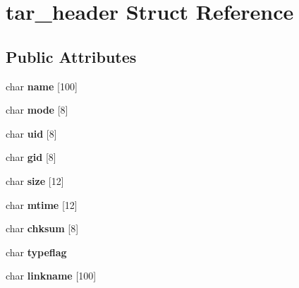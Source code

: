 \hypertarget{structtar__header}{\section{tar\+\_\+header Struct Reference}
\label{structtar__header}
}
\subsection*{Public Attributes}
\begin{DoxyCompactItemize}
\item 
\hypertarget{structtar__header_a921a7ac5906fd81909976fbc43fe404c}{char {\bfseries name} \mbox{[}100\mbox{]}}\label{structtar__header_a921a7ac5906fd81909976fbc43fe404c}

\item 
\hypertarget{structtar__header_a9c0f9c8fd9ef85f13b5e8cad47ca5217}{char {\bfseries mode} \mbox{[}8\mbox{]}}\label{structtar__header_a9c0f9c8fd9ef85f13b5e8cad47ca5217}

\item 
\hypertarget{structtar__header_a35c2f1c125c4ab1ee8bbb311ed9575ef}{char {\bfseries uid} \mbox{[}8\mbox{]}}\label{structtar__header_a35c2f1c125c4ab1ee8bbb311ed9575ef}

\item 
\hypertarget{structtar__header_aa1d8df38a2ac4ff6bf1ea1d99d0943a0}{char {\bfseries gid} \mbox{[}8\mbox{]}}\label{structtar__header_aa1d8df38a2ac4ff6bf1ea1d99d0943a0}

\item 
\hypertarget{structtar__header_ae0118a5add322d2cdf976cd1c3c82bd0}{char {\bfseries size} \mbox{[}12\mbox{]}}\label{structtar__header_ae0118a5add322d2cdf976cd1c3c82bd0}

\item 
\hypertarget{structtar__header_ade29454543ef3b9f6bfc47d4c0325ee4}{char {\bfseries mtime} \mbox{[}12\mbox{]}}\label{structtar__header_ade29454543ef3b9f6bfc47d4c0325ee4}

\item 
\hypertarget{structtar__header_a050e232fc9ed4ca3a22c0ce9c5b7748d}{char {\bfseries chksum} \mbox{[}8\mbox{]}}\label{structtar__header_a050e232fc9ed4ca3a22c0ce9c5b7748d}

\item 
\hypertarget{structtar__header_a8a9662777f906b3a4289881d49a4602c}{char {\bfseries typeflag}}\label{structtar__header_a8a9662777f906b3a4289881d49a4602c}

\item 
\hypertarget{structtar__header_a0f87c06d6b8eec283fb0a5f2482053d9}{char {\bfseries linkname} \mbox{[}100\mbox{]}}\label{structtar__header_a0f87c06d6b8eec283fb0a5f2482053d9}


\end{DoxyCompactItemize}
